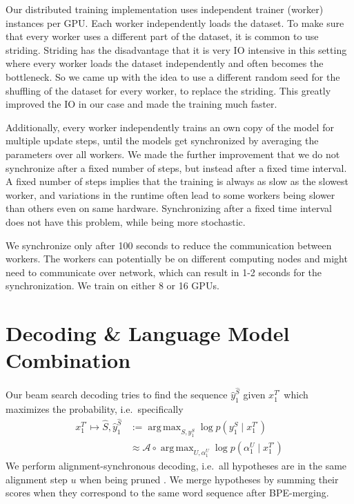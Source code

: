 \documentclass[a4paper]{article}
\DeclareMathOperator*{\argmax}{arg\,max}
\begin{document}
Our distributed training implementation
uses independent trainer (worker) instances per GPU.
Each worker independently loads the dataset.
To make sure that every worker uses a different part of the dataset,
it is common to use striding.
Striding has the disadvantage that it is very IO intensive
in this setting where every worker loads the dataset independently
and often becomes the bottleneck.
So we came up with the idea to use a different random seed
for the shuffling of the dataset for every worker,
to replace the striding.
This greatly improved the IO in our case
and made the training much faster.

Additionally, every worker independently trains an own copy of the model
for multiple update steps, until the models get synchronized
by averaging the parameters over all workers.
We made the further improvement that we do not synchronize
after a fixed number of steps,
but instead after a fixed time interval.
A fixed number of steps implies that the training is always as slow
as the slowest worker,
and variations in the runtime often lead to some workers
being slower than others even on same hardware.
Synchronizing after a fixed time interval does not have this problem,
while being more stochastic.

We synchronize only after 100 seconds
to reduce the communication between workers.
The workers can potentially be on different computing nodes
and might need to communicate over network,
which can result in 1-2 seconds for the synchronization.
We train on either 8 or 16 GPUs.


\section{Decoding \& Language Model Combination}

Our beam search decoding tries to find the sequence $\hat{y}_1^{\hat{S}}$
given $x_1^{T'}$ which maximizes the probability,
i.e.~specifically
\begin{align*}
x_1^{T'} \mapsto \hat{S}, \hat{y}_1^{\hat{S}} & := \argmax_{S, y_1^S} \log p(y_1^S \mid x_1^{T'}) \\
& \approx \mathcal{A} \circ \argmax_{U, \alpha_1^U} \log p(\alpha_1^U \mid x_1^{T'})
\end{align*}
We perform alignment-synchronous decoding,
i.e.~all hypotheses are in the same alignment step $u$
when being pruned \cite{zeyer2020:transducer,saon2020rnnt}.
We merge hypotheses by summing their scores
when they correspond to the same word sequence after BPE-merging.
\end{document}
